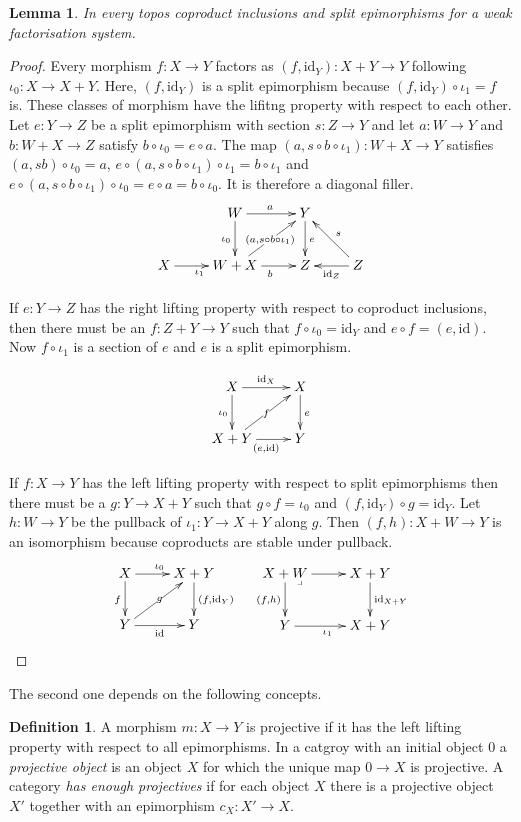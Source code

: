 \documentclass{amsart}
\theoremstyle{plain}
\newtheorem{lemma}[theorem]{Lemma}
\theoremstyle{definition}
\newtheorem{defin}[theorem]{Definition}
\newcommand\id{\mathrm{id}}
\begin{document}
\begin{lemma} In every topos coproduct inclusions and split epimorphisms for a weak factorisation system. \end{lemma}

\begin{proof} Every morphism $f:X\to Y$ factors as $(f,\id_Y):X+Y\to Y$ following $\iota_0:X\to X+Y$. Here, $(f,\id_Y)$ is a split epimorphism because $(f,\id_Y)\circ \iota_1 = f$ is. These classes of morphism have the lifitng property with respect to each other. Let $e:Y\to Z$ be a split epimorphism with section $s:Z\to Y$ and let $a:W\to Y$ and $b:W+X\to Z$ satisfy $b\circ \iota_0 = e\circ a$. The map $(a,s\circ b\circ \iota_1):W+X \to Y$ satisfies $(a,sb)\circ \iota_0 = a$, $e\circ (a,s\circ b\circ \iota_1)\circ \iota_1 = b\circ \iota_1$ and $e\circ (a,s\circ b\circ \iota_1)\circ \iota_0 = e\circ a = b\circ \iota_0$. It is therefore a diagonal filler.
\[\xymatrix{
& W\ar[d]_{\iota_0}\ar[r]^a & Y\ar[d]^e \\
X\ar[r]_{\iota_1} & W+X \ar[r]_b\ar[ur]|{(a,s\circ b\circ \iota_1)} & Z & Z \ar[l]^{\id_Z} \ar[ul]_{s} 
}\]

If $e:Y\to Z$ has the right lifting property with respect to coproduct inclusions, then there must be an $f:Z+Y\to Y$ such that $f\circ \iota_0 = \id_Y$ and $e\circ f = (e,\id)$. Now $f\circ \iota_1$ is a section of $e$ and $e$ is a split epimorphism.

\[\xymatrix{
X\ar[r]^{\id_X}\ar[d]_{\iota_0} & X\ar[d]^e\\
X+Y\ar[r]_{(e,\id)}\ar[ur]|f & Y
}\]

If $f:X\to Y$ has the left lifting property with respect to split epimorphisms then there must be a $g:Y\to X+Y$ such that $g\circ f = \iota_0$ and $(f,\id_Y)\circ g = \id_Y$. Let $h:W\to Y$ be the pullback of $\iota_1:Y\to X+Y$ along $g$. Then $(f,h):X+W \to Y$ is an isomorphism because coproducts are stable under pullback.
\[\xymatrix{
X\ar[r]^{\iota_0}\ar[d]_f & X+Y\ar[d]^{(f,\id_Y)}\\
Y\ar[r]_{\id}\ar[ur]|g & Y
}\quad\xymatrix{
X+W\ar[d]_{(f,h)} \ar[r]\ar@{}[dr]|<\lrcorner & X+Y\ar[d]^{\id_{X+Y}}\\
Y \ar[r]_{\iota_1} & X+Y
}\]

\end{proof}

The second one depends on the following concepts.
\begin{defin} A morphism $m:X\to Y$ is projective if it has the left lifting property with respect to all epimorphisms. In a catgroy with an initial object $0$ a \emph{projective object} is an object $X$ for which the unique map $0\to X$ is projective. A category \emph{has enough projectives} if for each object $X$ there is a projective object $X'$ together with an epimorphism $c_X:X'\to X$.
\end{defin}
\end{document}
